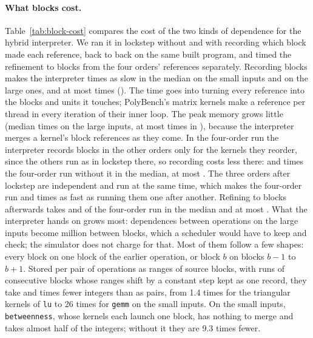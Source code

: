 \documentclass[11pt]{article}
\newcommand{\tabref}[1]{Table~\ref{#1}}
\newcommand{\code}[1]{\texttt{#1}}
\begin{document}
\paragraph{What blocks cost.} \tabref{tab:block-cost} compares the cost of the two kinds of dependence for the
hybrid interpreter. We ran it in lockstep without and with recording which block made each reference, back to back
on the same built program, and timed the refinement to blocks from the four orders' references separately.
Recording blocks makes the interpreter \numCostSmallTimeMed{} times as slow in the median on the small inputs and
\numCostLargeTimeMed{} on the large ones, and at most \numCostLargeTimeMax{} times (\code{\numCostLargeTimeMaxName{}}).
The time goes into turning every reference into the blocks and units it touches; PolyBench's matrix kernels make
a reference per thread in every iteration of their inner loop. The peak memory grows little (median
\numCostLargeMemMed{} times on the large inputs, at most \numCostLargeMemMax{} times in
\code{\numCostLargeMemMaxName{}}), because the interpreter merges a kernel's block references as they come. In the four-order run the interpreter records blocks in the
other orders only for the kernels they reorder, since the others run as in lockstep there, so recording costs less
there: \numCostSmallOrdersMed{} and \numCostLargeOrdersMed{} times the four-order run without it in the median, at
most \numCostLargeOrdersMax{}. The three orders after lockstep are independent and run at the same time, which
makes the four-order run \numCostSmallParallel{} and \numCostLargeParallel{} times as fast as running them one after
another. Refining to blocks afterwards takes \numCostSmallRefineShare{} and
\numCostLargeRefineShare{} of the four-order run in the median and at most \numCostLargeRefineShareMax{}. What the
interpreter hands on grows most: \numCostLargeOpDeps{} dependences between operations on the large inputs become
\numCostLargeBlockDeps{} million between blocks, which a scheduler would have to keep and check; the simulator does
not charge for that. Most of them follow a few shapes: every block on one block of the earlier operation, or block
$b$ on blocks $b-1$ to $b+1$. Stored per pair of operations as ranges of source blocks, with runs of consecutive
blocks whose ranges shift by a constant step kept as one record, they take \numCostSmallCompact{} and
\numCostLargeCompact{} times fewer integers than as pairs, from 1.4 times for the triangular kernels of \code{lu}
to 26 times for \code{gemm} on the small inputs. On the small inputs, \code{betweenness}, whose kernels each launch one
block, has nothing to merge and takes almost half of the integers; without it they are 9.3 times fewer.
\end{document}
